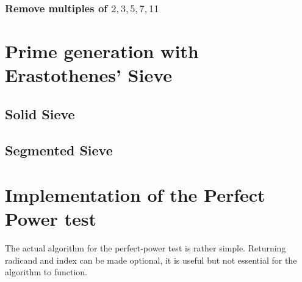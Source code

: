 \documentclass[a4paper,10pt]{report}
\theoremstyle{plain} %
\theoremstyle{definition}
\theoremstyle{remark}
\begin{document}
\subsubsection{Remove multiples of $2,3,5,7,11$}

\section{Prime generation with Erastothenes' Sieve}
\subsection{Solid Sieve}
\subsection{Segmented Sieve}



\section{Implementation of the Perfect Power test}
The actual algorithm for the perfect-power test is rather simple. Returning radicand and index can be made optional, it is useful but not essential for the algorithm to function.
\end{document}
